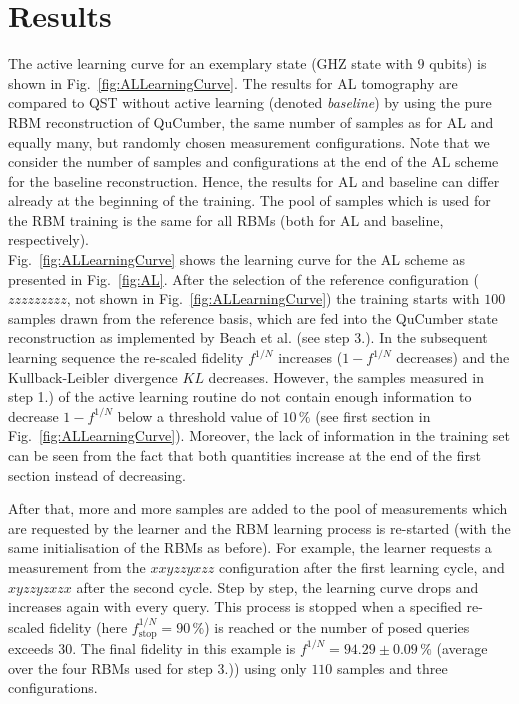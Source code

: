 \documentclass[pra,aps,showpacs,groupedaddress,superscriptaddress,twocolumn,toc=flat,biblatex,footinbib]{revtex4-1}
\begin{document}
\section{Results\label{sec:Results}}
The active learning curve for an exemplary state (GHZ state with $9$ qubits) is shown in Fig.~\ref{fig:ALLearningCurve}. The results for AL tomography are compared to QST without active learning (denoted \textit{baseline}) by using the pure RBM reconstruction of QuCumber, the same number of samples as for AL and equally many, but randomly chosen measurement configurations. Note that we consider the number of samples and configurations at the end of the AL scheme for the baseline reconstruction. Hence, the results for AL and baseline can differ already at the beginning of the training. The pool of samples which is used for the RBM training is the same for all RBMs (both for AL and baseline, respectively).\\

Fig.~\ref{fig:ALLearningCurve} shows the learning curve for the AL scheme as presented in Fig.~\ref{fig:AL}. After the selection of the reference configuration ($zzzzzzzzz$, not shown in Fig.~\ref{fig:ALLearningCurve}) the training starts with $100$ samples drawn from the reference basis, which are fed into the QuCumber state reconstruction as implemented by Beach et al. \cite{Beach2019} (see step 3.). In the subsequent learning sequence the re-scaled fidelity $f^{1/N}$ increases ($1-f^{1/N}$ decreases) and the Kullback-Leibler divergence $KL$ decreases. However, the samples measured in step 1.) of the active learning routine do not contain enough information to decrease $1-f^{1/N}$ below a threshold value of $10\, \%$ (see first section in Fig.~\ref{fig:ALLearningCurve}). Moreover, the lack of information in the training set can be seen from the fact that both quantities increase at the end of the first section instead of decreasing. 

After that, more and more samples are added to the pool of measurements which are requested by the learner and the RBM learning process is re-started (with the same initialisation of the RBMs as before). For example, the learner requests a measurement from the $xxyzzyxzz$ configuration after the first learning cycle, and $xyzzyzxzx$ after the second cycle. Step by step, the learning curve drops and increases again with every query. This process is stopped when a specified re-scaled fidelity (here $f^{1/N}_{\mathrm{stop}}=90\, \%$) is reached or the number of posed queries exceeds $30$. The final fidelity in this example is $f^{1/N}=94.29 \pm 0.09
\,\%$ (average over the four RBMs used for step 3.)) using only $110$ samples and three configurations. 
\end{document}
